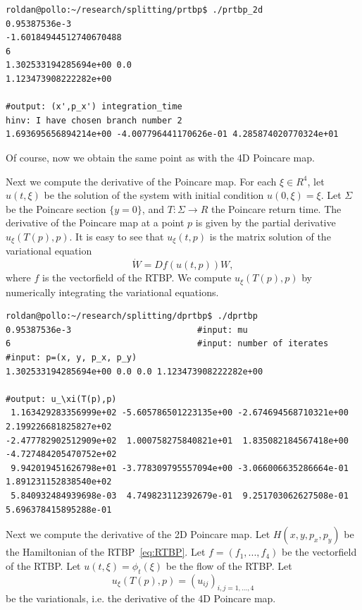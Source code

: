 \documentclass[a4paper]{amsart}
\theoremstyle{remark}
\begin{document}
\begin{verbatim}
roldan@pollo:~/research/splitting/prtbp$ ./prtbp_2d
0.95387536e-3
-1.60184944512740670488 
6
1.302533194285694e+00 0.0
1.123473908222282e+00

#output: (x',p_x') integration_time
hinv: I have chosen branch number 2
1.693695656894214e+00 -4.007796441170626e-01 4.285874020770324e+01
\end{verbatim}
Of course, now we obtain the same point as with the 4D Poincare map.

Next we compute the derivative of the Poincare map.
For each $\xi\in R^4$, let $u(t,\xi)$ be the solution of the system with
initial condition $u(0,\xi)=\xi$. 
Let $\Sigma$ be the Poincare section $\{y=0\}$, and $T:\Sigma\to R$ the
Poincare return time. 
The derivative of the Poincare map at a point $p$ is given by the partial
derivative $u_\xi(T(p),p)$.
It is easy to see that $u_\xi(t,p)$ is the matrix solution of the variational
equation
\[ \dot W = Df(u(t,p))W, \]
where $f$ is the vectorfield of the RTBP.
We compute $u_\xi(T(p),p)$ by numerically integrating the variational
equations.

\begin{verbatim}
roldan@pollo:~/research/splitting/dprtbp$ ./dprtbp
0.95387536e-3                         #input: mu 
6                                     #input: number of iterates 
#input: p=(x, y, p_x, p_y)
1.302533194285694e+00 0.0 0.0 1.123473908222282e+00

#output: u_\xi(T(p),p)
 1.163429283356999e+02 -5.605786501223135e+00 -2.674694568710321e+00  2.199226681825827e+02
-2.477782902512909e+02  1.000758275840821e+01  1.835082184567418e+00 -4.727484205470752e+02
 9.942019451626798e+01 -3.778309795557094e+00 -3.066006635286664e-01  1.891231152838540e+02
 5.840932484939698e-03  4.749823112392679e-01  9.251703062627508e-01  5.696378415895288e-01
\end{verbatim}

Next we compute the derivative of the 2D Poincare map.
Let $H(x,y,p_x,p_y)$ be the Hamiltonian of the RTBP~\eqref{eq:RTBP}.
Let $f=(f_1,...,f_4)$ be the vectorfield of the RTBP.
Let $u(t,\xi)=\phi_t(\xi)$ be the flow of the RTBP.
Let 
\[ u_\xi(T(p),p)=(u_{ij})_{i,j=1,\dots,4}\] 
be the variationals, i.e. the derivative of the 4D Poincare map.
\end{document}

